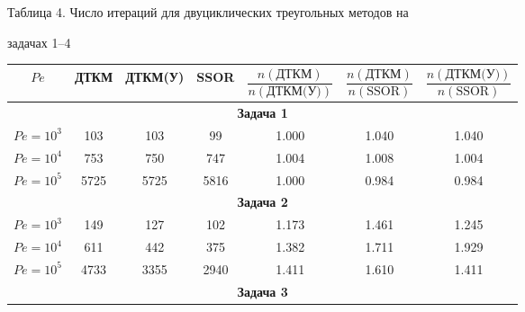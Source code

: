 \begin{center} 


Таблица 4. Число итераций для двуциклических треугольных методов на 


задачах 1--4


\medskip





\begin{tabular}{|c|c|c|c|c|c|c|} 


\hline 


$Pe$ & ДТКМ & ДТКМ(У) & SSOR & 


$\dfrac{n(\text{ДТКМ})}{n(\text{ДТКМ(У)})}$ & 


$\dfrac{n(\text{ДТКМ})}{n(\text{SSOR})}$ & 


$\dfrac{n(\text{ДТКМ(У)})}{n(\text{SSOR})}$ \\ 


\hline 


\multicolumn{7}{|c|}{\bf Задача 1} \\ 


\hline 


$Pe=10^3$ & 103 & 103 & 99 & 1.000 & 1.040 & 1.040 \\ 


\hline 


$Pe=10^4$ & 753 & 750 & 747 & 1.004 & 1.008 & 1.004 \\ 


\hline 


$Pe=10^5$ & 5725 & 5725 & 5816 & 1.000 & 0.984 & 0.984 \\ 


\hline 


\multicolumn{7}{|c|}{\bf Задача 2} \\ 


\hline 


$Pe=10^3$ & 149 & 127 & 102 & 1.173 & 1.461 & 1.245 \\ 


\hline 


$Pe=10^4$ & 611 & 442 & 375 & 1.382 & 1.711 & 1.929 \\ 


\hline 


$Pe=10^5$ & 4733 & 3355 & 2940 & 1.411 & 1.610 & 1.411 \\ 


\hline 


\multicolumn{7}{|c|}{\bf Задача 3}\\ 


\hline 



\end{tabular}
\end{center}
